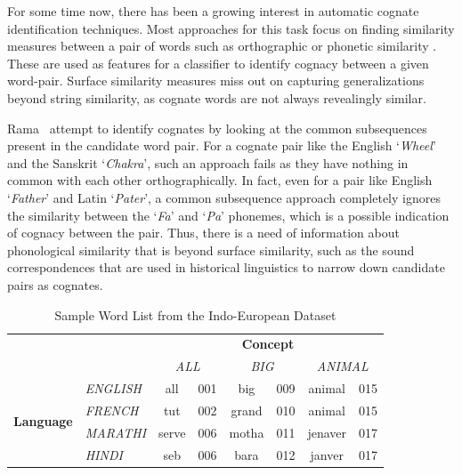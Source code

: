 \documentclass[11pt,letterpaper]{article}
\begin{document}
For some time now, there has been a growing interest in automatic cognate identification techniques. Most approaches for this task focus on finding similarity measures between a pair of words such as orthographic or phonetic similarity \cite{hauer2011clustering,inkpen2005similarity,List2016g}. These are used as features for a classifier to identify cognacy between a given word-pair. Surface similarity measures miss out on capturing generalizations beyond string similarity, as cognate words are not always revealingly similar. 

Rama~ attempt to identify cognates by looking at the common subsequences present in the candidate word pair. For a cognate pair like the English `\textit{Wheel}' and the Sanskrit `\textit{Chakra}', such an approach fails as they have nothing in common with each other orthographically. In fact, even for a pair like English `\textit{Father}' and Latin `\textit{Pater}', a common subsequence approach completely ignores the similarity between the `\textit{Fa}' and `\textit{Pa}' phonemes, which is a possible indication of cognacy between the pair. Thus, there is a need of information about phonological similarity that is beyond surface similarity, such as the sound correspondences that are used in historical linguistics to narrow down candidate pairs as cognates.

\begin{table}[ht]
\centering
\begin{tabular}{llcccccc}
\multicolumn{1}{c}{\textbf{}}                           & \multicolumn{1}{c}{\textbf{}}         & \multicolumn{6}{c}{\textbf{Concept}}                                                                      \\ \cline{3-8} 
\multicolumn{1}{c}{}                                    & \multicolumn{1}{c}{\textit{}}         & \multicolumn{2}{c}{\textit{ALL}} & \multicolumn{2}{c}{\textit{BIG}} & \multicolumn{2}{c}{\textit{ANIMAL}} \\ \cline{3-8} 
\multicolumn{1}{l|}{\multirow{4}{*}{\textbf{Language}}} & \multicolumn{1}{l|}{\textit{ENGLISH}} & all   & \multicolumn{1}{c|}{001} & big   & \multicolumn{1}{c|}{009} & animal   & \multicolumn{1}{c|}{015} \\ \cline{3-8} 
\multicolumn{1}{l|}{}                                   & \multicolumn{1}{l|}{\textit{FRENCH}}  & tut   & \multicolumn{1}{c|}{002} & grand & \multicolumn{1}{c|}{010} & animal   & \multicolumn{1}{c|}{015} \\ \cline{3-8} 
\multicolumn{1}{l|}{}                                   & \multicolumn{1}{l|}{\textit{MARATHI}} & serve & \multicolumn{1}{c|}{006} & motha & \multicolumn{1}{c|}{011} & jenaver  & \multicolumn{1}{c|}{017} \\ \cline{3-8} 
\multicolumn{1}{l|}{}                                   & \multicolumn{1}{l|}{\textit{HINDI}}   & seb   & \multicolumn{1}{c|}{006} & bara  & \multicolumn{1}{c|}{012} & janver   & \multicolumn{1}{c|}{017} \\ \cline{3-8} 
\end{tabular}
\label{sample_wordlist}
\caption{Sample Word List from the Indo-European Dataset}
\end{table}
\end{document}
